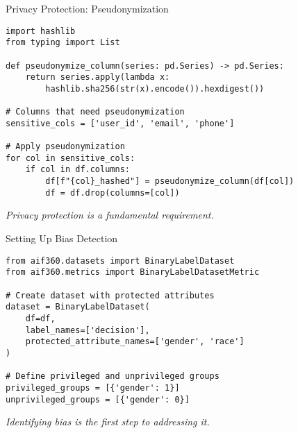 \documentclass[aspectratio=169]{beamer}
\begin{document}

\begin{frame}[fragile]{Privacy Protection: Pseudonymization}
\begin{verbatim}
import hashlib
from typing import List

def pseudonymize_column(series: pd.Series) -> pd.Series:
    return series.apply(lambda x:
        hashlib.sha256(str(x).encode()).hexdigest())

# Columns that need pseudonymization
sensitive_cols = ['user_id', 'email', 'phone']

# Apply pseudonymization
for col in sensitive_cols:
    if col in df.columns:
        df[f"{col}_hashed"] = pseudonymize_column(df[col])
        df = df.drop(columns=[col])
\end{verbatim}

\emph{Privacy protection is a fundamental requirement.}
\end{frame}


\begin{frame}[fragile]{Setting Up Bias Detection}
\begin{verbatim}
from aif360.datasets import BinaryLabelDataset
from aif360.metrics import BinaryLabelDatasetMetric

# Create dataset with protected attributes
dataset = BinaryLabelDataset(
    df=df,
    label_names=['decision'],
    protected_attribute_names=['gender', 'race']
)

# Define privileged and unprivileged groups
privileged_groups = [{'gender': 1}]
unprivileged_groups = [{'gender': 0}]
\end{verbatim}

\emph{Identifying bias is the first step to addressing it.}
\end{frame}
\end{document}
